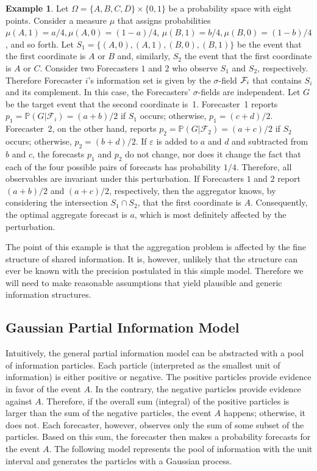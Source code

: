 \documentclass[11pt]{article}
\renewcommand{\P}{\mathbb{P}}
\theoremstyle{definition}
\newtheorem{example}[theorem]{Example}
\theoremstyle{definition}
\def\F{{\cal F}}
\def\P{{\mathbb P}}
\def\ee{\varepsilon}
\begin{document}
\begin{example}
Let $\Omega = \{ A,B,C,D \} \times \{ 0,1 \}$ be a probability space
with eight points.  Consider a measure $\mu$ that assigns
probabilities $\mu (A,1) = a/4, \mu (A,0) = (1-a)/4$, $\mu (B,1) =
b/4, \mu (B,0) = (1-b)/4$, and so forth. Let $S_1 = \{
(A,0),(A,1),(B,0),(B,1) \}$ be the event that the first coordinate is
$A$ or $B$ and, similarly, $S_2$ the event that the first coordinate
is $A$ or $C$. Consider two Forecasters $1$ and $2$ who observe $S_1$
and $S_2$, respectively. Therefore Forecaster $i$'s information set is
given by the $\sigma$-field $\F_i$ that contains $S_i$ and its
complement. In this case, the Forecasters' $\sigma$-fields are independent. Let
$G$ be the target event that the second coordinate is~1.  Forecaster~1
reports $p_1 = \P(G | \mathcal{F}_i) = (a+b)/2$ if $S_1$ occurs;
otherwise, $p_1 = (c+d)/2$.  Forecaster~2, on the other hand, reports
$p_2 = \P(G | \mathcal{F}_2) = (a+c)/2$ if $S_2$ occurs; otherwise,
$p_2 = (b+d)/2$.  If $\ee$ is added to $a$ and $d$ and subtracted from
$b$ and $c$, the forecasts $p_1$ and $p_2$ do not change, nor does it
change the fact that each of the four possible pairs of forecasts has
probability $1/4$.  Therefore, all observables are invariant under
this perturbation.  If Forecasters $1$ and $2$ report $(a+b)/2$ and
$(a+c)/2$, respectively, then the aggregator knows, by considering the
intersection $S_1 \cap S_2$, that the first coordinate is $A$.
Consequently, the optimal aggregate forecast is $a$, which is most
definitely affected by the perturbation.
\end{example}

The point of this example is that the aggregation problem is affected
by the fine structure of shared information.  It is, however, unlikely
that the structure can ever be known with the precision postulated in
this simple model.  Therefore we will need to make reasonable
assumptions that yield plausible and generic information structures.

\subsection{Gaussian Partial Information Model}
\label{ss:Gaussian}
Intuitively, the general partial information model can be abstracted with a pool of information particles. Each particle (interpreted as the smallest unit of information) is either positive or negative. The positive particles provide evidence in favor of the event $A$. 
In the contrary, the negative particles provide evidence against $A$. Therefore, if the overall sum (integral) of the positive particles is larger than the sum of the negative particles, the event $A$ happens; otherwise, it does not. Each forecaster, however, observes only the sum of some subset of the particles. Based on this sum, the forecaster then makes a probability forecasts for the event $A$. The following model represents the pool of information with the unit interval and generates the particles with a Gaussian process. 
\end{document}
